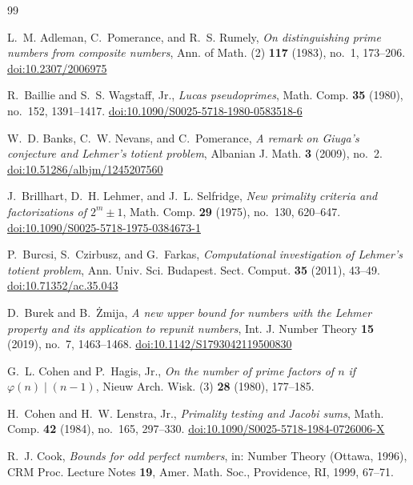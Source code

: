 \documentclass[11pt,reqno]{amsart}
\numberwithin{equation}{section}
\theoremstyle{plain}
\theoremstyle{definition}
\theoremstyle{remark}
\begin{document}
\begin{thebibliography}{99}

L.~M. Adleman, C.~Pomerance, and R.~S. Rumely,
\emph{On distinguishing prime numbers from composite numbers},
Ann. of Math. (2) \textbf{117} (1983), no.~1, 173--206.
\href{https://doi.org/10.2307/2006975}{doi:10.2307/2006975}

R.~Baillie and S.~S. Wagstaff, Jr.,
\emph{Lucas pseudoprimes},
Math. Comp. \textbf{35} (1980), no.~152, 1391--1417.
\href{https://doi.org/10.1090/S0025-5718-1980-0583518-6}{doi:10.1090/S0025-5718-1980-0583518-6}

W.~D. Banks, C.~W. Nevans, and C.~Pomerance,
\emph{A remark on Giuga's conjecture and Lehmer's totient problem},
Albanian J. Math. \textbf{3} (2009), no.~2.
\href{https://doi.org/10.51286/albjm/1245207560}{doi:10.51286/albjm/1245207560}

J.~Brillhart, D.~H. Lehmer, and J.~L. Selfridge,
\emph{New primality criteria and factorizations of $2^m\pm1$},
Math. Comp. \textbf{29} (1975), no.~130, 620--647.
\href{https://doi.org/10.1090/S0025-5718-1975-0384673-1}{doi:10.1090/S0025-5718-1975-0384673-1}

P.~Burcsi, S.~Czirbusz, and G.~Farkas,
\emph{Computational investigation of Lehmer's totient problem},
Ann. Univ. Sci. Budapest. Sect. Comput. \textbf{35} (2011), 43--49.
\href{https://doi.org/10.71352/ac.35.043}{doi:10.71352/ac.35.043}

D.~Burek and B.~\.Zmija,
\emph{A new upper bound for numbers with the Lehmer property and its
application to repunit numbers},
Int. J. Number Theory \textbf{15} (2019), no.~7, 1463--1468.
\href{https://doi.org/10.1142/S1793042119500830}{doi:10.1142/S1793042119500830}

G.~L. Cohen and P.~Hagis, Jr.,
\emph{On the number of prime factors of $n$ if $\varphi(n)\mid(n-1)$},
Nieuw Arch. Wisk. (3) \textbf{28} (1980), 177--185.

H.~Cohen and H.~W. Lenstra, Jr.,
\emph{Primality testing and Jacobi sums},
Math. Comp. \textbf{42} (1984), no.~165, 297--330.
\href{https://doi.org/10.1090/S0025-5718-1984-0726006-X}{doi:10.1090/S0025-5718-1984-0726006-X}

R.~J. Cook,
\emph{Bounds for odd perfect numbers},
in: Number Theory (Ottawa, 1996), CRM Proc. Lecture Notes \textbf{19},
Amer. Math. Soc., Providence, RI, 1999, 67--71.


\end{thebibliography}
\end{document}
